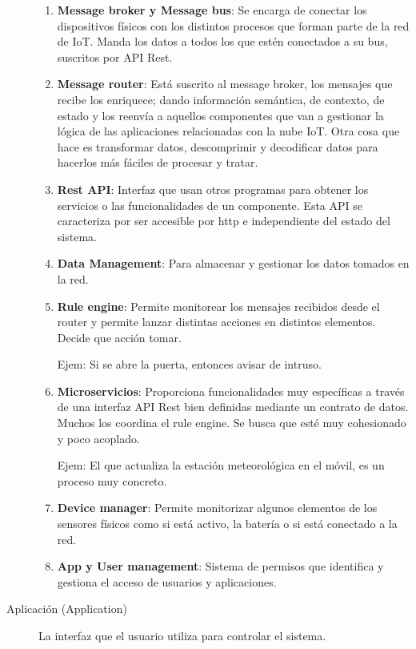 \documentclass[12pt, twoside, openright]{report} %
\begin{document}
\begin{description}
	      \begin{enumerate}
		      \item \textbf{Message broker y Message bus}: Se encarga de conectar los
		            dispositivos físicos con los distintos procesos que forman parte de la
		            red de IoT. Manda los datos a todos los que estén conectados a su bus,
		            suscritos por API Rest.
		      \item \textbf{Message router}: Está suscrito al message broker, los mensajes
		            que recibe los enriquece; dando información semántica, de contexto, de
		            estado y los reenvía a aquellos componentes que van a gestionar la
		            lógica de las aplicaciones relacionadas con la nube IoT. Otra cosa que
		            hace es transformar datos, descomprimir y decodificar datos para
		            hacerlos más fáciles de procesar y tratar.
		      \item \textbf{Rest API}: Interfaz que usan otros programas para obtener los
		            servicios o las funcionalidades de un componente. Esta API se
		            caracteriza por ser accesible por http e independiente del estado del
		            sistema.
		      \item \textbf{Data Management}: Para almacenar y gestionar los datos tomados
		            en la red.
		      \item \textbf{Rule engine}: Permite monitorear los mensajes recibidos desde
		            el router y permite lanzar distintas acciones en distintos elementos.
		            Decide que acción tomar.

		            Ejem: Si se abre la puerta, entonces avisar de intruso.
		      \item \textbf{Microservicios}: Proporciona funcionalidades muy específicas a
		            través de una interfaz API Rest bien definidas mediante un contrato de
		            datos. Muchos los coordina el rule engine. Se busca que esté muy
		            cohesionado y poco acoplado.

		            Ejem: El que actualiza la estación meteorológica en el móvil, es un
		            proceso muy concreto.
		      \item \textbf{Device manager}: Permite monitorizar algunos elementos de los
		            sensores físicos como si está activo, la batería o si está conectado a
		            la red.
		      \item \textbf{App y User management}: Sistema de permisos que identifica y
		            gestiona el acceso de usuarios y aplicaciones.
	      \end{enumerate}

	\item[Aplicación (Application)] La interfaz que el usuario utiliza
	      para controlar el sistema.

\end{description}
\end{document}
